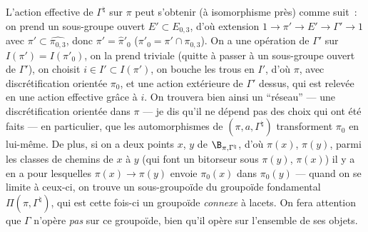 L'action effective de $\Gamma^\natural$ sur $\pi$ peut s'obtenir (à isomorphisme près) comme suit~: on prend un sous-groupe ouvert $E'\subset E_{0,3}$, d'où extension $1\to\pi'\to E'\to\Gamma' \to 1$ avec $\pi'\subset \hat{\pi_{0,3}}$, donc $\pi'=\hat{\pi}'_0$ ($\pi'_0=\pi'\cap\pi_{0,3}$).  On a une opération de $\Gamma'$ sur $I(\pi')=I(\pi'_0)$, on la prend triviale (quitte à passer à un sous-groupe ouvert de $\Gamma'$), on choisit $i\in I'\subset  I(\pi')$, on bouche les trous en $I'$, d'où $\pi$, avec discrétification orientée $\pi_0$, et une action extérieure de $\Gamma'$ dessus, qui est relevée en une action effective grâce à $i$.  On trouvera bien ainsi un ``réseau'' --- une discrétification orientée dans $\pi$ --- je dis qu'il ne dépend pas des choix qui ont été faits --- en particulier, que les automorphismes de $(\pi,a,\Gamma^\natural)$ transforment $\pi_0$ en lui-même.  De plus, si on a deux points $x$, $y$ de $\B_{\pi,\Gamma^\natural}$, d'où $\pi(x)$, $\pi(y)$, parmi les classes de chemins de $x$ à $y$ (qui font un bitorseur sous $\pi(y)$, $\pi(x)$) il y a en a pour lesquelles $\pi(x)\to\pi(y)$ envoie $\pi_0(x)$ dans $\pi_0(y)$ --- quand on se limite à ceux-ci, on trouve un sous-groupoïde du groupoïde fondamental $\Pi(\pi,\Gamma^\natural)$, qui est cette fois-ci un groupoïde \emph{connexe} à lacets.  On fera attention que $\Gamma$ n'opère \emph{pas} sur ce groupoïde, bien qu'il opère sur l'ensemble de ses objets.


